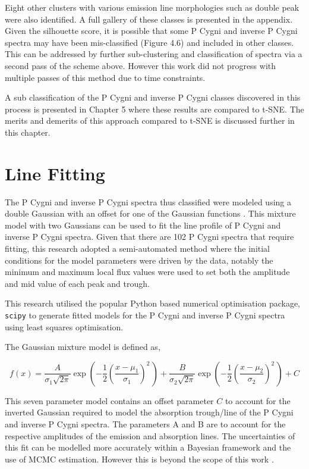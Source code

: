 Eight other clusters with various emission line morphologies such as double peak were also identified. A full gallery of these classes is presented in the appendix. Given the silhouette score, it is possible that some P Cygni and inverse P Cygni spectra may have been mis-classified (Figure 4.6) and included in other classes. This can be addressed by further sub-clustering and classification of spectra via a second pass of the scheme above. However this work did not progress with multiple passes of this method due to time constraints. 

A sub classification of the P Cygni and inverse P Cygni classes discovered in this process is presented in Chapter 5 where these results are compared to t-SNE. The merits and demerits of this approach compared to t-SNE is discussed further in this chapter. 

\section{Line Fitting}

The P Cygni and inverse P Cygni spectra thus classified were modeled using a double Gaussian with an offset for one of the Gaussian functions \cite{traven2015gaia}\cite{traven2017galah}\cite{zhang2021catalog}. This mixture model with two Gaussians can be used to fit the line profile of P Cygni and inverse P Cygni spectra. Given that there are 102 P Cygni spectra that require fitting, this research adopted a semi-automated method where the initial conditions for the model parameters were driven by the data, notably the minimum and maximum local flux values were used to set both the amplitude and mid value of each peak and trough.

This research utilised the popular Python based numerical optimisation package, \texttt{scipy} \cite{2020SciPy-NMeth} to generate fitted models for the P Cygni and inverse P Cygni spectra using least squares optimisation.

The Gaussian mixture model is defined as, 

\begin{equation}
    f(x) = \frac{A}{\sigma_1\sqrt{2\pi}} 
  \exp\left( -\frac{1}{2}\left(\frac{x-\mu_1}{\sigma_1}\right)^{\!2}\,\right) + \frac{B}{\sigma_2\sqrt{2\pi}} 
  \exp\left( -\frac{1}{2}\left(\frac{x-\mu_2}{\sigma_2}\right)^{\!2}\,\right) + C
\end{equation}


This seven parameter model contains an offset parameter $C$ to account for the inverted Gaussian required to model the absorption trough/line of the P Cygni and inverse P Cygni spectra. The parameters A and B are to account for the respective amplitudes of the emission and absorption lines. The uncertainties of this fit can be modelled more accurately within a Bayesian framework and the use of MCMC estimation. However this is beyond the scope of this work \cite{hogg2010data}.

